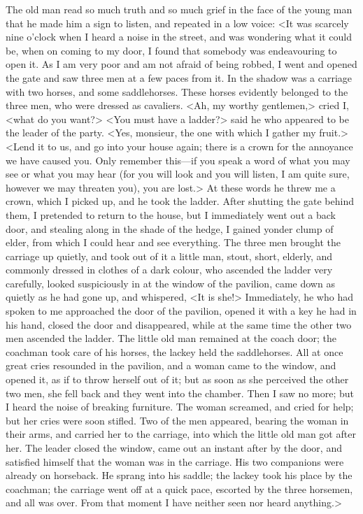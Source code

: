 The old man read so much truth and so much grief in the face of the young man that he made him a sign to listen, and repeated in a low voice: <It was scarcely nine o'clock when I heard a noise in the street, and was wondering what it could be, when on coming to my door, I found that somebody was endeavouring to open it. As I am very poor and am not afraid of being robbed, I went and opened the gate and saw three men at a few paces from it. In the shadow was a carriage with two horses, and some saddlehorses. These horses evidently belonged to the three men, who were dressed as cavaliers. <Ah, my worthy gentlemen,> cried I, <what do you want?> <You must have a ladder?> said he who appeared to be the leader of the party. <Yes, monsieur, the one with which I gather my fruit.> <Lend it to us, and go into your house again; there is a crown for the annoyance we have caused you. Only remember this—if you speak a word of what you may see or what you may hear (for you will look and you will listen, I am quite sure, however we may threaten you), you are lost.> At these words he threw me a crown, which I picked up, and he took the ladder. After shutting the gate behind them, I pretended to return to the house, but I immediately went out a back door, and stealing along in the shade of the hedge, I gained yonder clump of elder, from which I could hear and see everything. The three men brought the carriage up quietly, and took out of it a little man, stout, short, elderly, and commonly dressed in clothes of a dark colour, who ascended the ladder very carefully, looked suspiciously in at the window of the pavilion, came down as quietly as he had gone up, and whispered, <It is she!> Immediately, he who had spoken to me approached the door of the pavilion, opened it with a key he had in his hand, closed the door and disappeared, while at the same time the other two men ascended the ladder. The little old man remained at the coach door; the coachman took care of his horses, the lackey held the saddlehorses. All at once great cries resounded in the pavilion, and a woman came to the window, and opened it, as if to throw herself out of it; but as soon as she perceived the other two men, she fell back and they went into the chamber. Then I saw no more; but I heard the noise of breaking furniture. The woman screamed, and cried for help; but her cries were soon stifled. Two of the men appeared, bearing the woman in their arms, and carried her to the carriage, into which the little old man got after her. The leader closed the window, came out an instant after by the door, and satisfied himself that the woman was in the carriage. His two companions were already on horseback. He sprang into his saddle; the lackey took his place by the coachman; the carriage went off at a quick pace, escorted by the three horsemen, and all was over. From that moment I have neither seen nor heard anything.> 

